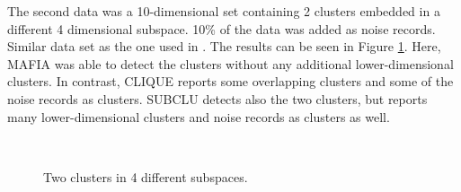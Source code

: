 The second data was a 10-dimensional set containing 2 clusters embedded in a different 4 dimensional subspace. 10\% of the data was added as noise records. Similar data set as the one used in \cite{mafia}. The results can be seen in Figure \ref{fig:accuracy_2clusters}. Here, MAFIA was able to detect the clusters without any additional lower-dimensional clusters. In contrast, CLIQUE reports some overlapping clusters and some of the noise records as clusters. SUBCLU detects also the two clusters, but reports many lower-dimensional clusters and noise records as clusters as well.
\begin{figure}[H]
    \vspace*{-0.7cm}
    \centering
    ~~~~
    ~~~~
    \caption{Two clusters in 4 different subspaces.}
    \label{fig:accuracy_2clusters}
    \vspace*{-0.7cm}
\end{figure}

